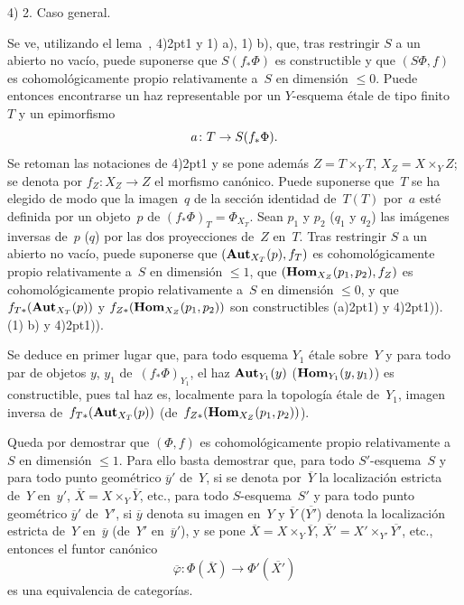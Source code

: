 
4) 2. Caso general.\par\nopagebreak
Se ve, utilizando el lema~, 4)\kern2pt1 y
{1)\kern2pt a),}
{1)\kern2pt b),}
que, tras restringir $S$ a un abierto no vacío, puede suponerse que
$S(f_*\Phi)$ es constructible y que $(S\Phi,f)$ es cohomológicamente
propio relativamente a~$S$ en dimensión $\leqslant 0$. Puede entonces
encontrarse un haz representable por un $Y$-esquema étale de tipo
finito~$T$ y un epimorfismo
$$
a \colon T \to S(f_*\Phi).
$$
Se retoman las notaciones de 4)\kern2pt1 y se pone además
$Z=T\times_Y T$, $X_Z=X\times_Y Z$; se denota por
$f_Z \colon X_Z \to Z$ el morfismo canónico. Puede suponerse que~$T$
se ha elegido de modo que la imagen~$q$ de la sección identidad de~$T(T)$
por~$a$ esté definida por un objeto~$p$ de
$(f_*\Phi)_T=\Phi_{X_T}$. Sean $p_1$ y $p_2$ (\resp $q_1$ y $q_2$)
las imágenes inversas de~$p$ (\resp $q$) por las dos proyecciones
de~$Z$ en~$T$. Tras restringir $S$ a un abierto no vacío, puede
suponerse que $(\operatorname{\mathbf{Aut}}_{X_T}(p),f_T)$ es cohomológicamente propio
relativamente a~$S$ en dimensión $\leqslant 1$, que
$(\operatorname{\mathbf{Hom}}_{X_Z}(p_1,p_2),f_Z)$ es cohomológicamente propio
relativamente a~$S$ en dimensión $\leqslant 0$, y que
$f_{T*}(\operatorname{\mathbf{Aut}}_{X_T}(p))$ y
$f_{Z*}(\operatorname{\mathbf{Hom}}_{X_Z}(p_1,p_2))$ son constructibles
{(a)\kern2pt1) y 4)\kern2pt1)).}
{(1)\kern2pt b) y 4)\kern2pt1)).}

Se deduce en primer lugar que, para todo esquema $Y_1$ étale sobre~$Y$
y para todo par de objetos $y$, $y_1$ de~$(f_*\Phi)_{Y_1}$, el haz
$\operatorname{\mathbf{Aut}}_{Y_1}(y)$ (\resp $\operatorname{\mathbf{Hom}}_{Y_1}(y,y_1)$) es
constructible, pues tal haz es, localmente para la topología étale
de~$Y_1$, imagen inversa de~$f_{T*}(\operatorname{\mathbf{Aut}}_{X_T}(p))$
(\resp de~$f_{Z*}(\operatorname{\mathbf{Hom}}_{X_Z}(p_1,p_2))$).

Queda por demostrar que $(\Phi,f)$ es cohomológicamente propio
relativamente
a~$S$ en dimensión $\leqslant 1$. Para ello basta demostrar que,
{para todo $S'$-esquema~$S$ y para todo punto geométrico
$\overline{y}'$ de~$Y$, si se denota por~$\overline{Y}$ la localización
estricta de~$Y$ en~$y'$, $\overline{X}=X\times_Y\overline{Y}$, etc.,}
{para todo $S$-esquema~$S'$ y para todo punto geométrico
$\overline{y}'$ de~$Y'$, si $\overline{y}$ denota su imagen en~$Y$ y
$\overline{Y}$ (\resp $\overline{Y'}$) denota la localización estricta
de~$Y$ en~$\overline{y}$ (\resp de~$Y'$ en~$\overline{y}'$), y se pone
$\overline{X}=X\times_Y\overline{Y}$,
$\overline{X'}=X'\times_{Y'}\overline{Y'}$, etc.,}
entonces el funtor canónico
$$
\overline{\varphi} \colon \Phi(\overline{X}) \to
\Phi'(\overline{X'})
$$
es una equivalencia de categorías.

